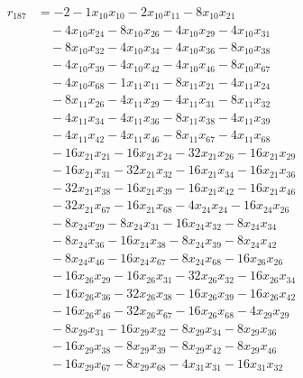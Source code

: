 \[\begin{aligned}
r_{187} &= - 2 - 1 x_{10} x_{10} - 2 x_{10} x_{11} - 8 x_{10} x_{21} \\
 &\quad - 4 x_{10} x_{24} - 8 x_{10} x_{26} - 4 x_{10} x_{29} - 4 x_{10} x_{31} \\
 &\quad - 8 x_{10} x_{32} - 4 x_{10} x_{34} - 4 x_{10} x_{36} - 8 x_{10} x_{38} \\
 &\quad - 4 x_{10} x_{39} - 4 x_{10} x_{42} - 4 x_{10} x_{46} - 8 x_{10} x_{67} \\
 &\quad - 4 x_{10} x_{68} - 1 x_{11} x_{11} - 8 x_{11} x_{21} - 4 x_{11} x_{24} \\
 &\quad - 8 x_{11} x_{26} - 4 x_{11} x_{29} - 4 x_{11} x_{31} - 8 x_{11} x_{32} \\
 &\quad - 4 x_{11} x_{34} - 4 x_{11} x_{36} - 8 x_{11} x_{38} - 4 x_{11} x_{39} \\
 &\quad - 4 x_{11} x_{42} - 4 x_{11} x_{46} - 8 x_{11} x_{67} - 4 x_{11} x_{68} \\
 &\quad - 16 x_{21} x_{21} - 16 x_{21} x_{24} - 32 x_{21} x_{26} - 16 x_{21} x_{29} \\
 &\quad - 16 x_{21} x_{31} - 32 x_{21} x_{32} - 16 x_{21} x_{34} - 16 x_{21} x_{36} \\
 &\quad - 32 x_{21} x_{38} - 16 x_{21} x_{39} - 16 x_{21} x_{42} - 16 x_{21} x_{46} \\
 &\quad - 32 x_{21} x_{67} - 16 x_{21} x_{68} - 4 x_{24} x_{24} - 16 x_{24} x_{26} \\
 &\quad - 8 x_{24} x_{29} - 8 x_{24} x_{31} - 16 x_{24} x_{32} - 8 x_{24} x_{34} \\
 &\quad - 8 x_{24} x_{36} - 16 x_{24} x_{38} - 8 x_{24} x_{39} - 8 x_{24} x_{42} \\
 &\quad - 8 x_{24} x_{46} - 16 x_{24} x_{67} - 8 x_{24} x_{68} - 16 x_{26} x_{26} \\
 &\quad - 16 x_{26} x_{29} - 16 x_{26} x_{31} - 32 x_{26} x_{32} - 16 x_{26} x_{34} \\
 &\quad - 16 x_{26} x_{36} - 32 x_{26} x_{38} - 16 x_{26} x_{39} - 16 x_{26} x_{42} \\
 &\quad - 16 x_{26} x_{46} - 32 x_{26} x_{67} - 16 x_{26} x_{68} - 4 x_{29} x_{29} \\
 &\quad - 8 x_{29} x_{31} - 16 x_{29} x_{32} - 8 x_{29} x_{34} - 8 x_{29} x_{36} \\
 &\quad - 16 x_{29} x_{38} - 8 x_{29} x_{39} - 8 x_{29} x_{42} - 8 x_{29} x_{46} \\
 &\quad - 16 x_{29} x_{67} - 8 x_{29} x_{68} - 4 x_{31} x_{31} - 16 x_{31} x_{32} \\

\end{aligned}\]
